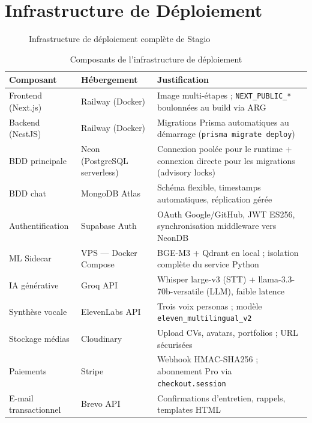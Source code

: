 ﻿\documentclass[12pt,a4paper]{report}
\begin{document}
\section{Infrastructure de Déploiement}

\begin{figure}[H]
\centering
\resizebox{\textwidth}{!}{}
\caption{Infrastructure de déploiement complète de Stagio}
\label{fig:infra}
\end{figure}

\begin{table}[H]
\centering
\begin{tabularx}{\textwidth}{llX}
\toprule
\textbf{Composant} & \textbf{Hébergement} & \textbf{Justification} \\
\midrule
Frontend (Next.js)  & Railway (Docker)            & Image multi-étapes ; \texttt{NEXT\_PUBLIC\_*} boulonnées au build via ARG \\
Backend (NestJS)    & Railway (Docker)            & Migrations Prisma automatiques au démarrage (\texttt{prisma migrate deploy}) \\
BDD principale      & Neon (PostgreSQL serverless) & Connexion poolée pour le runtime + connexion directe pour les migrations (advisory locks) \\
BDD chat            & MongoDB Atlas               & Schéma flexible, timestamps automatiques, réplication gérée \\
Authentification    & Supabase Auth               & OAuth Google/GitHub, JWT ES256, synchronisation middleware vers NeonDB \\
ML Sidecar          & VPS — Docker Compose        & BGE-M3 + Qdrant en local ; isolation complète du service Python \\
IA générative       & Groq API                    & Whisper large-v3 (STT) + llama-3.3-70b-versatile (LLM), faible latence \\
Synthèse vocale     & ElevenLabs API              & Trois voix personas ; modèle \texttt{eleven\_multilingual\_v2} \\
Stockage médias     & Cloudinary                  & Upload CVs, avatars, portfolios ; URL sécurisées \\
Paiements           & Stripe                      & Webhook HMAC-SHA256 ; abonnement Pro via \texttt{checkout.session} \\
E-mail transactionnel & Brevo API                 & Confirmations d'entretien, rappels, templates HTML \\
\bottomrule
\end{tabularx}
\caption{Composants de l'infrastructure de déploiement}
\label{tab:infra}
\end{table}
\end{document}

